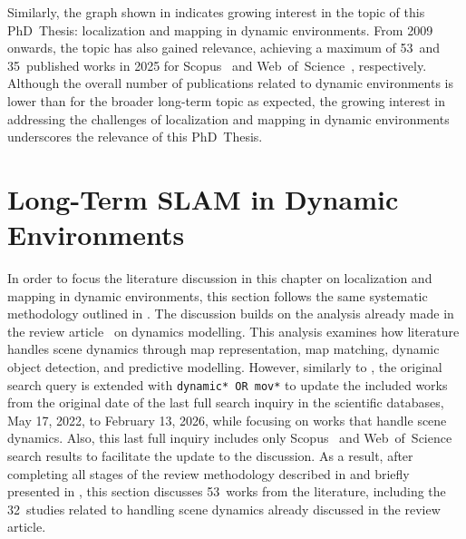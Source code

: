 Similarly, the graph shown in
indicates growing interest in the topic of this PhD~Thesis:
localization and mapping in dynamic environments.
From 2009 onwards, the topic has also gained relevance,
achieving a maximum of 53~and 35~published works in 2025 for
Scopus~\cite{scopus} and Web~of~Science~\cite{wos}, respectively.
Although the overall number of publications related to dynamic environments
is lower than for the broader long-term topic as expected,
the growing interest in addressing the challenges of
localization and mapping in dynamic environments
underscores the relevance of this PhD~Thesis.

\section{Long-Term SLAM in Dynamic Environments}\label{sec:literature:dynamic}

In order to focus the literature discussion in this chapter on localization and
mapping in dynamic environments, this section follows the same
systematic methodology outlined in .
The discussion builds on the analysis already made in the review
article~\cite{sousa:jfr:2023} on dynamics modelling. This analysis examines
how literature handles scene dynamics through map representation, map matching,
dynamic object detection, and predictive modelling. However,
similarly to ,
the original search query is extended with \texttt{dynamic* OR mov*} to update
the included works from the original date of the last full search inquiry
in the scientific databases, May 17, 2022, to February 13, 2026,
while focusing on works that handle scene dynamics.
Also, this last full inquiry includes only
Scopus~\cite{scopus} and Web~of~Science~\cite{wos} search results
to facilitate the update to the discussion. As a result, after completing
all stages of the review methodology described in 
and briefly presented in ,
this section discusses 53~works from the literature, including the 32~studies
related to handling scene dynamics already discussed in the review article.

